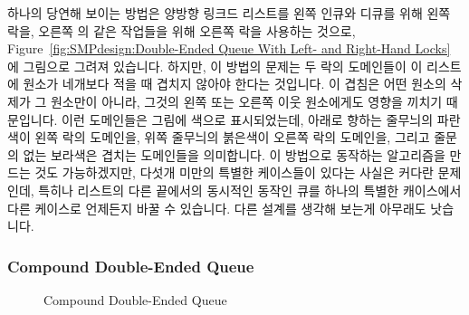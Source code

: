 하나의 당연해 보이는 방법은 양방향 링크드 리스트를 왼쪽 인큐와 디큐를 위해 왼쪽
락을, 오른쪽 의 같은 작업들을 위해 오른쪽 락을 사용하는 것으로,
Figure~\ref{fig:SMPdesign:Double-Ended Queue With Left- and Right-Hand Locks}
에 그림으로 그려져 있습니다.
하지만, 이 방법의 문제는 두 락의 도메인들이 이 리스트에 원소가 네개보다 적을 때
겹치지 않아야 한다는 것입니다.
이 겹침은 어떤 원소의 삭제가 그 원소만이 아니라, 그것의 왼쪽 또는 오른쪽 이웃
원소에게도 영향을 끼치기 때문입니다.
이런 도메인들은 그림에 색으로 표시되었는데, 아래로 향하는 줄무늬의 파란색이
왼쪽 락의 도메인을, 위쪽 줄무늬의 붉은색이 오른쪽 락의 도메인을, 그리고 줄문의
없는 보라색은 겹치는 도메인들을 의미합니다.
이 방법으로 동작하는 알고리즘을 만드는 것도 가능하겠지만, 다섯개 미만의 특별한
케이스들이 있다는 사실은 커다란 문제인데, 특히나 리스트의 다른 끝에서의
동시적인 동작인 큐를 하나의 특별한 캐이스에서 다른 케이스로 언제든지 바꿀 수
있습니다.
다른 설계를 생각해 보는게 아무래도 낫습니다.

\subsubsection{Compound Double-Ended Queue}
\label{sec:SMPdesign:Compound Double-Ended Queue}

\begin{figure}[tb]
\begin{center}
\end{center}
\caption{Compound Double-Ended Queue}
\label{fig:SMPdesign:Compound Double-Ended Queue}
\end{figure}

